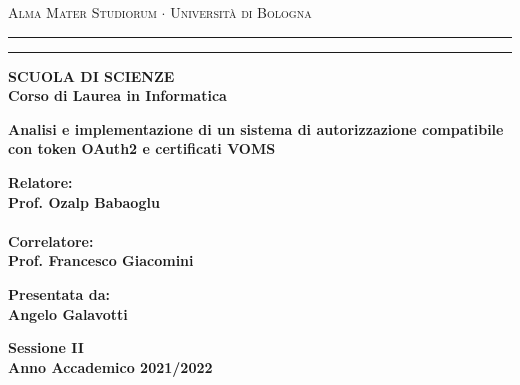 \documentclass[12pt,a4paper,openright,twoside]{report}
\begin{document}
\begin{titlepage}
	\begin{center}
		{{\Large{\textsc{Alma Mater Studiorum $\cdot$ Università di
							Bologna}}}} \rule[0.1cm]{15.8cm}{0.1mm}
		\rule[0.5cm]{15.8cm}{0.6mm}
		{\small{\bf SCUOLA DI SCIENZE\\
				Corso di Laurea in Informatica }}
	\end{center}
	\vspace{15mm}
	\begin{center}
		{\LARGE{\bf Analisi e implementazione di un sistema di autorizzazione compatibile con token OAuth2 e certificati VOMS}}\\
		\vspace{3mm}
	\end{center}
	\vspace{40mm}
	\par
	\noindent
	\begin{minipage}[t]{0.47\textwidth}
		{\large{\bf Relatore:\\
				Prof. Ozalp Babaoglu\\\\
				Correlatore:\\
				Prof. Francesco Giacomini}}
	\end{minipage}
	\hfill
	\begin{minipage}[t]{0.47\textwidth}\raggedleft
		{\large{\bf Presentata da:\\
				Angelo Galavotti}}
	\end{minipage}
	\vspace{20mm}
	\begin{center}
		{\large{\bf Sessione II\\
				Anno Accademico 2021/2022}}
	\end{center}
\end{titlepage}
\end{document}

